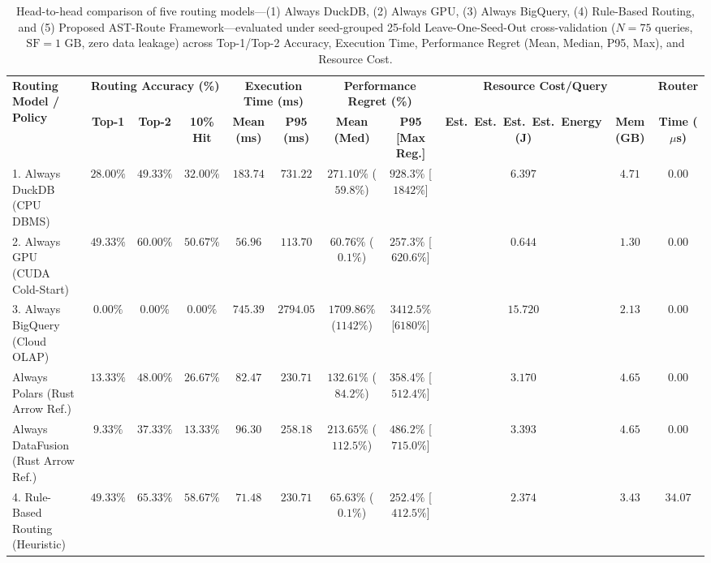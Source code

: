 \documentclass[10pt,a4paper]{article}
\begin{document}
\begin{table}[!t]
\centering
\caption{Head-to-head comparison of five routing models---(1) Always DuckDB, (2) Always GPU, (3) Always BigQuery, (4) Rule-Based Routing, and (5) Proposed AST-Route Framework---evaluated under seed-grouped 25-fold Leave-One-Seed-Out cross-validation ($N=75$ queries, $\text{SF}=1\text{ GB}$, zero data leakage) across Top-1/Top-2 Accuracy, Execution Time, Performance Regret (Mean, Median, P95, Max), and Resource Cost.}
\label{tab:routing_evaluation}\label{tab:query_routing}\label{tab:router_eval}
\scriptsize
\setlength{\tabcolsep}{3.2pt}
\renewcommand{\arraystretch}{1.12}
\begin{tabular}{@{}lcccccccccc@{}}
\toprule
\multirow{2}{*}{\textbf{Routing Model / Policy}} & \multicolumn{3}{c}{\textbf{Routing Accuracy (\%)}} & \multicolumn{2}{c}{\textbf{Execution Time (ms)}} & \multicolumn{2}{c}{\textbf{Performance Regret (\%)}} & \multicolumn{2}{c}{\textbf{Resource Cost/Query}} & \textbf{Router} \\
\cmidrule(lr){2-4} \cmidrule(lr){5-6} \cmidrule(lr){7-8} \cmidrule(lr){9-10} \cmidrule(lr){11-11}
 & \textbf{Top-1} & \textbf{Top-2} & \textbf{10\% Hit} & \textbf{Mean (ms)} & \textbf{P95 (ms)} & \textbf{Mean (Med)} & \textbf{P95 [Max Reg.]} & \textbf{Est.\ Est.\ Est.\ Est.\ Energy (J)} & \textbf{Mem (GB)} & \textbf{Time ($\mu$s)} \\
\midrule
1. Always DuckDB (CPU DBMS) & $28.00\%$ & $49.33\%$ & $32.00\%$ & $183.74$ & $731.22$ & $271.10\%$ ($59.8\%$) & $928.3\%$ [$1842\%$] & $6.397$ & $4.71$ & $0.00$ \\
2. Always GPU (CUDA Cold-Start) & $49.33\%$ & $60.00\%$ & $50.67\%$ & $56.96$ & $113.70$ & $60.76\%$ ($0.1\%$) & $257.3\%$ [$620.6\%$] & $0.644$ & $1.30$ & $0.00$ \\
3. Always BigQuery (Cloud OLAP) & $0.00\%$ & $0.00\%$ & $0.00\%$ & $745.39$ & $2794.05$ & $1709.86\%$ ($1142\%$) & $3412.5\%$ [$6180\%$] & $15.720$ & $2.13$ & $0.00$ \\
Always Polars (Rust Arrow Ref.) & $13.33\%$ & $48.00\%$ & $26.67\%$ & $82.47$ & $230.71$ & $132.61\%$ ($84.2\%$) & $358.4\%$ [$512.4\%$] & $3.170$ & $4.65$ & $0.00$ \\
Always DataFusion (Rust Arrow Ref.) & $9.33\%$ & $37.33\%$ & $13.33\%$ & $96.30$ & $258.18$ & $213.65\%$ ($112.5\%$) & $486.2\%$ [$715.0\%$] & $3.393$ & $4.65$ & $0.00$ \\
4. Rule-Based Routing (Heuristic) & $49.33\%$ & $65.33\%$ & $58.67\%$ & $71.48$ & $230.71$ & $65.63\%$ ($0.1\%$) & $252.4\%$ [$412.5\%$] & $2.374$ & $3.43$ & $34.07$ \\

\end{tabular}
\end{table}
\end{document}

